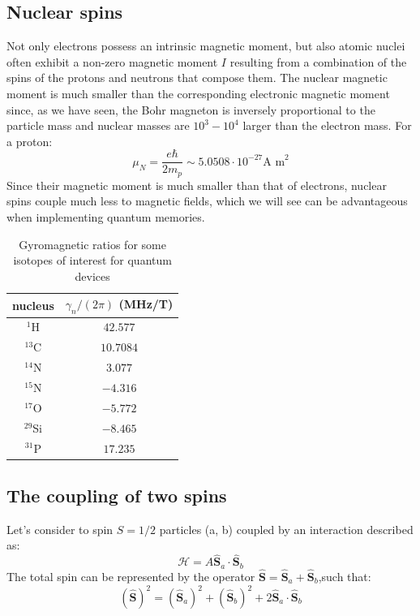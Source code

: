 \documentclass[a4paper,11pt]{article}
\begin{document}
\subsection {Nuclear spins}
Not only electrons possess an intrinsic magnetic moment, but also atomic nuclei often exhibit a non-zero magnetic moment $I$ resulting from a combination of the spins of the protons and neutrons that compose them. The nuclear magnetic moment is much smaller than the corresponding electronic magnetic moment since, as we have seen, the Bohr magneton is inversely proportional to the particle mass and nuclear masses are $10^3-10^4$ larger than the electron mass. For a proton:
\begin{equation}
    \mu_N = \frac{e \hbar}{2 m_p} \sim 5.0508 \cdot 10^{-27} \mbox{A m}^2
\end{equation}
Since their magnetic moment is much smaller than that of electrons, nuclear spins couple much less to magnetic fields, which we will see can be advantageous when implementing quantum memories.

\begin{table}[h]
\centering
\begin{tabular}{c | c }
nucleus & $\gamma_n/(2\pi)$ (MHz/T) \\
\hline
$^1$H & $42.577$  \\
$^{13}$C & $10.7084$  \\
$^{14}$N & $3.077$  \\
$^{15}$N & $-4.316$   \\
$^{17}$O & $-5.772$  \\
$^{29}$Si & $-8.465$  \\
$^{31}$P & $17.235$  
\end{tabular}
\caption{Gyromagnetic ratios for some isotopes of interest for quantum devices}
\label{tab:gamma_n}
\end{table}

\subsection{The coupling of two spins}
Let's consider to spin $S=1/2$ particles (a, b) coupled by an interaction described as:
\begin{equation}
    \mathcal{H} = A \mathbf{\hat{S}}_a \cdot \mathbf{\hat{S}}_b
\end{equation}
The total spin can be represented by the operator $ \mathbf{\hat{S}} = \mathbf{\hat{S}}_a + \mathbf{\hat{S}}_b$,such that:
\begin{equation}
    (\mathbf{\hat{S}})^2 = (\mathbf{\hat{S}}_a)^2 + (\mathbf{\hat{S}}_b)^2 + 2 \mathbf{\hat{S}}_a \cdot \mathbf{\hat{S}}_b
\end{equation}
\end{document}
